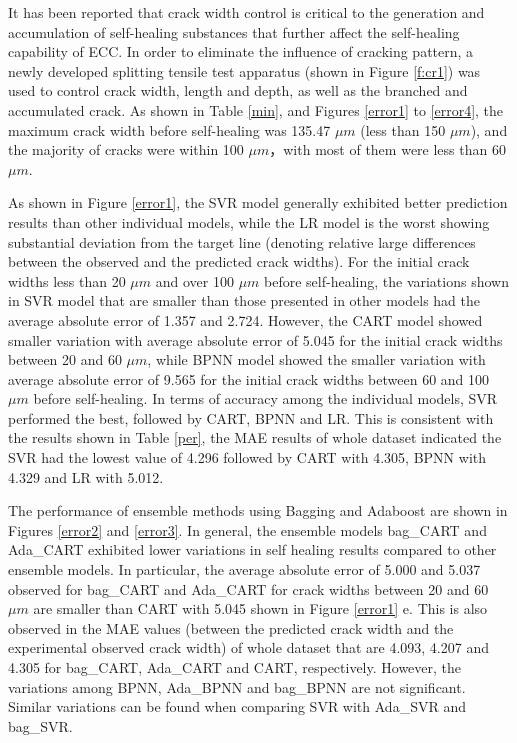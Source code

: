 \documentclass[11pt]{article}
\begin{document}
	It has been reported that crack width control is critical to the generation and accumulation of self-healing substances \cite{vidal2004analyzing,wang1997permeability,reinhardt2003permeability,edvardsen1999water,qiu2016coupled} that further affect the self-healing capability of ECC. In order to eliminate the influence of cracking pattern, a newly developed splitting tensile test apparatus (shown in Figure \ref{f:cr1}) was used to control crack width, length and depth, as well as the branched and accumulated crack. As shown in Table \ref{min}, and Figures \ref{error1} to \ref{error4}, the maximum crack width before self-healing was 135.47 $\mu m$ (less than 150 $\mu m$), and the majority of cracks were within 100 $\mu m$，with most of them were less than 60 $\mu m$. 

    As shown in Figure \ref{error1}, the SVR model generally exhibited better prediction results than other individual models, while the LR model is the worst showing substantial deviation from the target line (denoting relative large differences between the observed and the predicted crack widths). For the initial crack widths less than 20 $\mu m$ and over 100 $\mu m$ before self-healing, the variations shown in SVR model that are smaller than those presented in other models had the average absolute error of 1.357 and 2.724. However, the CART model showed
    smaller variation with average absolute error of 5.045 for the initial crack widths between 20 and 60 $\mu m$, while BPNN model showed the smaller variation with average absolute error of 9.565 for the initial crack widths between 60 and 100 $\mu m$ before self-healing. In terms of accuracy among the individual models, SVR performed the best, followed by CART, BPNN and LR. This is consistent with the results shown in Table \ref{per}, the MAE results of whole dataset indicated the SVR had the lowest value of 4.296 followed by CART with 4.305, BPNN with 4.329 and LR with 5.012.
    
	
    The performance of ensemble methods using Bagging and Adaboost are shown in Figures \ref{error2} and \ref{error3}. In general, the ensemble models  bag\_CART and Ada\_CART exhibited lower variations in self healing results compared to other ensemble models. In particular, the average absolute error of 5.000 and 5.037 observed for bag\_CART and Ada\_CART for crack widths between 20 and 60 $\mu m$ are smaller than CART with 5.045 shown in Figure \ref{error1} e. This is also observed in the MAE values (between the predicted crack width and the experimental observed crack width) of whole dataset that are 4.093, 4.207 and 4.305 for bag\_CART, Ada\_CART and CART, respectively. However, the variations among BPNN, Ada\_BPNN and bag\_BPNN are not significant. Similar variations can be found when comparing SVR with Ada\_SVR and bag\_SVR.
    
\end{document}
